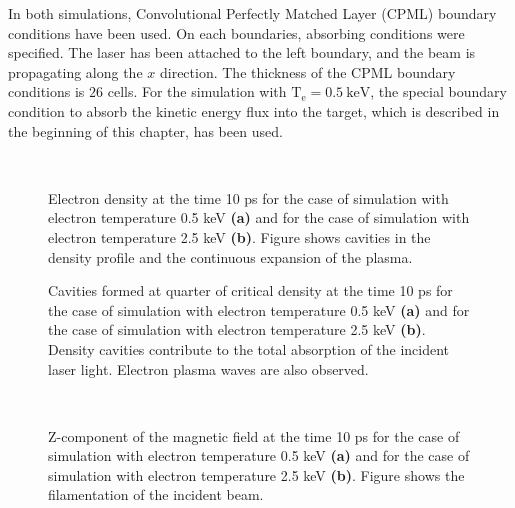 In both simulations, Convolutional Perfectly Matched Layer (CPML) boundary conditions have been used. On each boundaries, absorbing conditions were specified. The laser has been attached to the left boundary, and the beam is propagating along the $ x $ direction. The thickness of the CPML boundary conditions is $ 26 $ cells. For the simulation with $ \mathrm{T_e} = 0.5 \: \mathrm{keV} $, the special boundary condition to absorb the kinetic energy flux into the target, which is described in the beginning of this chapter, has been used. 

\begin{figure}[h!]
	\\
	\caption{Electron density at the time 10 ps for the case of simulation with electron temperature 0.5 keV \textbf{(a)} and for the case of simulation with electron temperature 2.5 keV \textbf{(b)}. Figure shows cavities in the density profile and the continuous expansion of the plasma.}
	\label{fig:ne}
\end{figure}

\begin{figure}[h!]
	\centering
	\caption{Cavities formed at quarter of critical density at the time 10 ps for the case of simulation with electron temperature 0.5 keV \textbf{(a)} and for the case of simulation with electron temperature 2.5 keV \textbf{(b)}. Density cavities contribute to the total absorption of the incident laser light. Electron plasma waves are also observed.}%
	\label{fig:cav}%
\end{figure}

\begin{figure}[h!]
	\\
	\caption{Z-component of the magnetic field at the time 10 ps for the case of simulation with electron temperature 0.5 keV \textbf{(a)} and for the case of simulation with electron temperature 2.5 keV \textbf{(b)}. Figure shows the filamentation of the incident beam.}
	\label{fig:Bz}
\end{figure}

